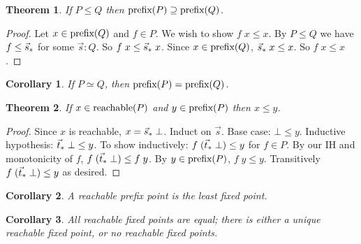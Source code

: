 \documentclass{article}
\newtheorem{theorem}{Theorem}
\newtheorem{corollary}{Corollary}
\begin{document}
\begin{theorem}
  If $P \le Q$ then $\text{prefix}(P) \supseteq \text{prefix}(Q)$.
\end{theorem}

\begin{proof}
  Let $x \in \text{prefix}(Q)$ and $f \in P$. We wish to show $f\;x \le x$. By $P \le
  Q$ we have $f \le {\vec{s}_*}$ for some $\vec{s} : Q$. So $f\;x \le {\vec{s}_*}\;x$.
  Since $x \in \text{prefix}(Q)$, ${\vec{s}_*}\;x \le x$. So $f\; x \le x$.
\end{proof}

\begin{corollary}
  If $P \simeq Q$, then $\text{prefix}(P) = \text{prefix}(Q)$.
\end{corollary}

\begin{theorem}
  If $x \in \text{reachable}(P)$ and $y \in \text{prefix}(P)$ then $x \le y$.
\end{theorem}

\begin{proof}
  Since $x$ is reachable, $x = {\vec{s}_*}\; \bot$. Induct on $\vec{s}$. Base case:
  $\bot \le y$. Inductive hypothesis: ${\vec{t}_*}\; \bot \le y$. To show
  inductively: $f\; ({\vec{t}_*}\; \bot) \le y$ for $f \in P$. By our IH and
  monotonicity of $f$, $f\;({\vec{t}_*}\; \bot) \le f\; y$. By $y \in \text{prefix}(P)$,
  $f\;y \le y$. Transitively $f\; ({\vec{t}_*}\; \bot) \le y$ as desired.
\end{proof}

\begin{corollary}
  A reachable prefix point is the least fixed point.
\end{corollary}

\begin{corollary}
  All reachable fixed points are equal; there is either a unique reachable
  fixed point, or no reachable fixed points.
\end{corollary}
\end{document}
